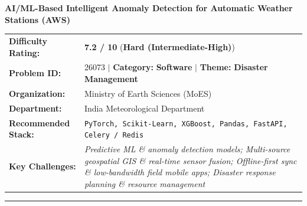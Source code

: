 \documentclass[10pt,a4paper]{article}
\begin{document}
\begin{tcolorbox}[pscard, title={"\textbf{SIH26073} \quad $\vert$ \quad AI/ML-Based Intelligent Anomaly Detection for Automatic Weather Stations (A...}]
\textbf{\large AI/ML-Based Intelligent Anomaly Detection for Automatic Weather Stations (AWS)}\\[0.25cm]

\begin{tabular}{@{}lp{12.5cm}@{}}
\textbf{Difficulty Rating:} & \textcolor{diffhard}{\textbf{\Large 7.2 / 10}} \quad (\textbf{Hard (Intermediate-High)}) \\
\textbf{Problem ID:} & 26073 \quad $\vert$ \quad \textbf{Category:} \textbf{Software} \quad $\vert$ \quad \textbf{Theme:} \textbf{Disaster Management} \\
\textbf{Organization:} & Ministry of Earth Sciences (MoES) \\
\textbf{Department:} & India Meteorological Department \\
\textbf{Recommended Stack:} & \texttt{PyTorch, Scikit-Learn, XGBoost, Pandas, FastAPI, Celery / Redis} \\
\textbf{Key Challenges:} & \textit{\small Predictive ML \& anomaly detection models; Multi-source geospatial GIS \& real-time sensor fusion; Offline-first sync \& low-bandwidth field mobile apps; Disaster response planning \& resource management} \\
\end{tabular}

\vspace{0.2cm}
\hrule
\vspace{0.2cm}


\end{tcolorbox}
\end{document}
